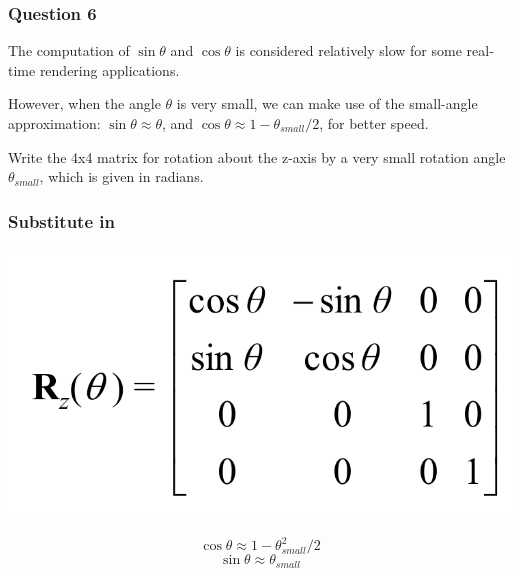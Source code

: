 \documentclass{beamer}
\begin{document}
\begin{frame}
    \frametitle{Question 6}

    The computation of $\sin \theta$ and $\cos \theta$ is considered relatively slow 
    for some real-time rendering applications. \\

    \vspace{1em}

    However, when the angle $\theta$ is very small, we can make use of the small-angle 
    approximation: $\sin \theta \approx \theta$, and $\cos \theta \approx 1 - \theta_{small}/2$, 
    for better speed.\\

    \vspace{1em}
    
    Write the 4x4 matrix for rotation about the z-axis by a very small rotation angle $\theta_{small}$, 
    which is given in radians. 

\end{frame}

\begin{frame}
    \frametitle{Substitute in}

    \begin{center}
        \includegraphics[scale=0.3]{rot-mat.png}
    \end{center}
    
    \begin{tcolorbox}
        $$ \cos \theta \approx 1 - \theta^2_{small}/2 $$
        $$ \sin \theta \approx \theta_{small} $$
    \end{tcolorbox}

\end{frame}
\end{document}
